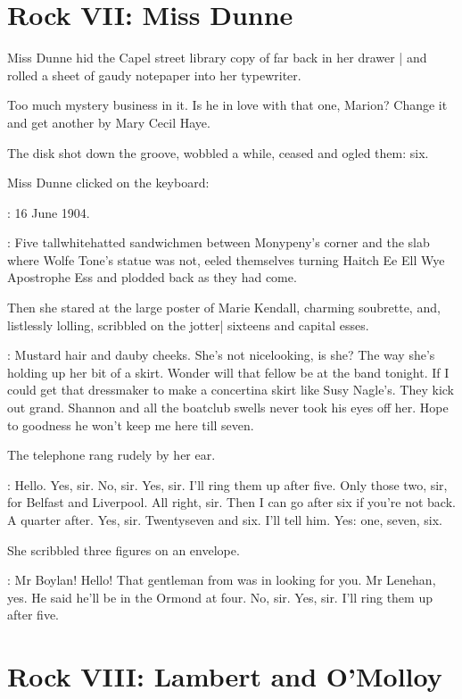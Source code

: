 \section*{Rock VII: Miss Dunne}


Miss Dunne hid the Capel street library copy
of  far back in her drawer |
and rolled a sheet of gaudy notepaper into her typewriter.%

Too much mystery business in it.
Is he in love with that one, Marion?
Change it and get another by Mary Cecil Haye.

The disk shot down the groove,
wobbled a while,
ceased and ogled them: six.

Miss Dunne clicked on the keyboard:

\missdunne:
16 June 1904.

:
Five tallwhitehatted sandwichmen
between Monypeny's corner and the slab where Wolfe Tone's statue was not,
eeled themselves turning
Haitch Ee Ell Wye Apostrophe Ess \stage{[H.E.L.Y.'S]}
and plodded back as they had come.

Then she stared at the large poster of Marie Kendall,
charming soubrette,
and,
listlessly lolling,
scribbled on the jotter|
sixteens and capital esses.

\dunneint:
Mustard hair and dauby cheeks.
She's not nicelooking, is she?
The way she's holding up her bit of a skirt.
Wonder will that fellow be at the band tonight.
If I could get that dressmaker to make a concertina skirt like Susy Nagle's.
They kick out grand.
Shannon and all the boatclub swells never took his eyes off her.
Hope to goodness he won't keep me here till seven.

The telephone rang rudely by her ear.

\missdunne:
Hello.
Yes, sir.
No, sir.
Yes, sir.
I'll ring them up after five.
Only those two, sir, for Belfast and Liverpool.
All right, sir.
Then I can go after six if you're not back.
A quarter after.
Yes, sir.
Twentyseven and six.
I'll tell him.
Yes: one, seven, six.

She scribbled three figures on an envelope.

\missdunne:
Mr Boylan!
Hello!
That gentleman from  was in looking for you.
Mr Lenehan, yes.
He said he'll be in the Ormond at four.
No, sir.
Yes, sir.
I'll ring them up after five.


\section*{Rock VIII: Lambert and O'Molloy}


